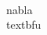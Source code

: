 \documentclass[preview]{standalone}
\begin{document}
\begin{center}
\quad\\nabla\quad\\textbf{u}
\end{center}
\end{document}
